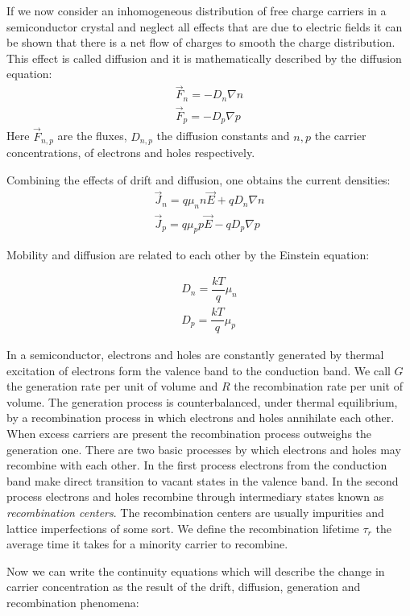 If we now consider an inhomogeneous distribution of free charge carriers in a semiconductor crystal 
and neglect all effects that are due to electric fields it can be shown that there is a net flow 
of charges to smooth the charge distribution. This effect is called diffusion and it is mathematically 
described by the diffusion equation:
\begin{align}
\vec{F}_n=-D_n\nabla{n}\label{eq:nDiff}\\
\vec{F}_p=-D_p\nabla{p}\label{eq:pDiff}
\end{align}
Here $\vec{F}_{n,p}$ are the fluxes, $D_{n,p}$ the diffusion constants and 
 $n,p$ the carrier concentrations,  of electrons and holes respectively.

Combining the effects of drift and diffusion, one obtains the current densities:
\begin{align}
\vec{J}_n=q\mu_nn\vec{E}+qD_n\nabla{n}\label{eq:nCurrf}\\
\vec{J}_p=q\mu_pp\vec{E}-qD_p\nabla{p}\label{eq:pCurr}
\end{align}

Mobility and diffusion are related to each other by the Einstein equation:

\begin{align}
D_n=\dfrac{kT}{q}\mu_n\label{nEinst}\\
D_p=\dfrac{kT}{q}\mu_p\label{pEinst}
\end{align}

In a semiconductor, electrons and holes are constantly generated by thermal excitation of electrons 
form the valence band to the conduction band. We call $G$ the  generation rate per unit of 
volume and $R$ the  recombination rate per unit of volume. 
The generation process is counterbalanced, under 
thermal equilibrium, by a recombination process in which electrons and holes annihilate each other. 
When excess carriers are present the recombination process outweighs the generation one. 
There are two basic processes by which electrons and holes may recombine with each other. In the 
first process electrons from the conduction band make direct transition to vacant states in the valence 
band. In the second process electrons and holes recombine through intermediary states known as 
{\it recombination centers}. The recombination centers are usually impurities and lattice imperfections 
of some sort. 
We define the recombination lifetime $\tau_r$ the average time it takes for a minority carrier to 
recombine. 


Now we can write the continuity equations which will describe the change in carrier concentration 
as the result of the drift, diffusion, generation and recombination phenomena:

